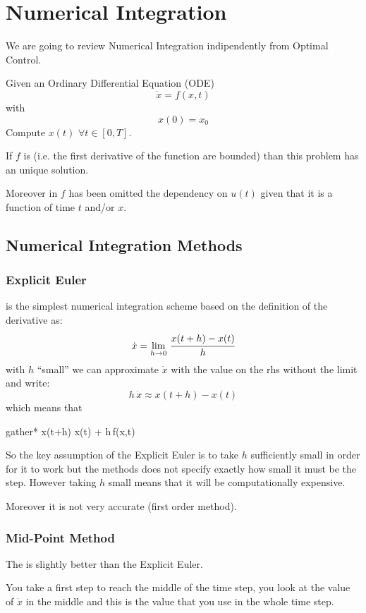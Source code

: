 
\appendix
\chapter{Numerical Integration}
\label{sec:num}

We are going to review Numerical Integration indipendently from Optimal Control.

Given an Ordinary Differential Equation (ODE)
\[\dot{x} = f(x,t)\]
with 
\[x(0) = x_0\]
Compute $x(t)\,\,\forall t \in [0, T]$.

If $f$ is  (i.e. the first derivative of the function are bounded) than this problem has an unique solution.

Moreover in $f$ has been omitted the dependency on $u(t)$ given that it is a function of time $t$ and/or $x$.

\section{Numerical Integration Methods}
\subsection{Explicit Euler}
 is the simplest numerical integration scheme based on the definition of the derivative as:
\[\dot{x} = \lim_{h\to 0} \,\cfrac{x(t+h) - x(t)}{h}\]
with $h$ ``small'' we can approximate $\dot{x}$ with the value on the rhs without the limit and write:
\[h\,\dot{x} \approx x(t+h) - x(t)\]
which means that 
\begin{empheq}[box=%
	\fbox]{gather*}
x(t+h) \approx x(t) + h\,f(x,t)
	\end{empheq}

So the key assumption of the Explicit Euler is to take $h$ sufficiently small in order for it to work but the methods does not specify exactly how small it must be the step. However taking $h$ small means that it will be computationally expensive.

Moreover it is not very accurate (first order method).

\subsection{Mid-Point Method}
The  is slightly better than the Explicit Euler. 

You take a first step to reach the middle of the time step, you look at the value of $\dot{x}$ in the middle and this is the value that you use in the whole time step.

